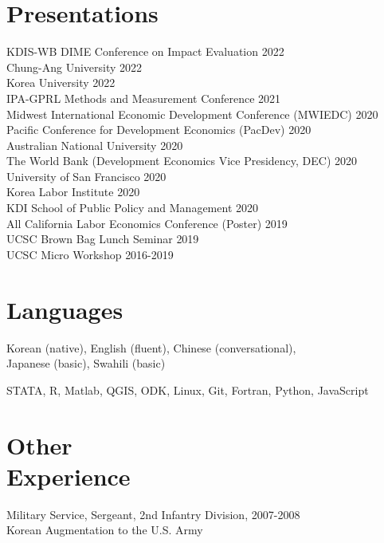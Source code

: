 \documentclass[letterpaper, margin, 10pt]{res} %
\newcommand{\blank}[1]{\hspace*{#1}\linebreak[0]}
\begin{document}
\begin{resume}
\section{Presentations}
KDIS-WB DIME Conference on Impact Evaluation  \hfill{2022}\\
Chung-Ang University  \hfill{2022}\\
Korea University  \hfill{2022}\\
IPA-GPRL Methods and Measurement Conference  \hfill{2021}\\
Midwest International Economic Development Conference (MWIEDC)  \hfill{2020}\\
Pacific Conference for Development Economics (PacDev) \hfill{2020}\\
Australian National University \hfill{2020}\\
The World Bank (Development Economics Vice Presidency, DEC) \hfill{2020}\\
University of San Francisco \hfill{2020}\\
Korea Labor Institute \hfill{2020}\\
KDI School of Public Policy and Management \hfill{2020}\\
All California Labor Economics Conference (Poster)   \hfill{2019}\\
UCSC Brown Bag Lunch Seminar  \hfill{2019}\\
UCSC Micro Workshop \hfill{2016-2019}



\section{\sc \textbf{Languages}}
Korean (native), English (fluent), Chinese (conversational), \\ Japanese (basic), Swahili (basic)

STATA, R, Matlab, QGIS, ODK, Linux, Git, Fortran, Python, JavaScript

\section{\sc \textbf{Other \\ Experience}}
Military Service, Sergeant, 2nd Infantry Division, \hfill{2007-2008} \\
\blank{0.5cm} Korean Augmentation to the U.S. Army


\end{resume}
\end{document}
